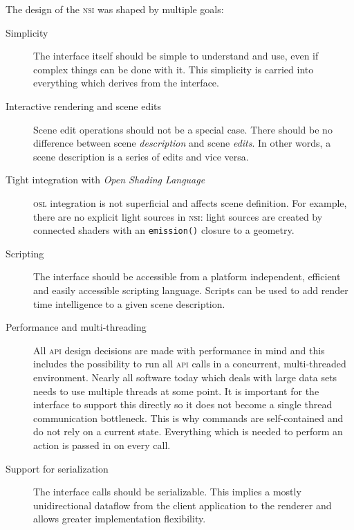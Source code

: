 \documentclass[oneside,ebook]{memoir}
\newcommand*{\acronym}[1]{\textsc{\lowercase{#1}}}
\begin{document}
The design of the \acronym{NSI} was shaped by multiple goals:\label{designgoal}
\begin{description}
\item[Simplicity]
The interface itself should be simple to understand and use, even if complex things can be done with it. This simplicity is carried into everything which derives from the interface.

\item[Interactive rendering and scene edits]
Scene edit operations should not be a special case. There should be no difference between scene \emph{description} and scene \emph{edits}. In other words, a scene description is a series of edits and vice versa.
\item[Tight integration with \textit{Open Shading Language}]
\index{osl integration@\acronym{OSL} integration}
\acronym{OSL} integration is not superficial and affects scene definition. For example, there are no explicit light sources in \acronym{NSI}: light sources are created by connected shaders with an \lstinline|emission()| closure to a geometry.
\item[Scripting]
The interface should be accessible from a platform independent, efficient and easily accessible scripting language. Scripts can be used to add render time intelligence to a given scene description.
\item[Performance and multi-threading]
All \acronym{API} design decisions are made with performance in mind and this includes the possibility to run all  \acronym{API} calls in a concurrent, multi-threaded environment.  Nearly all software today which deals with large data sets needs to use multiple threads at some point. It is important for the interface to support this directly so it does not become a single thread communication bottleneck. This is why commands are self-contained and do not rely on a current state. Everything which is needed to perform an action is passed in on every call.

\item[Support for serialization]
The interface calls should be serializable. This implies a mostly unidirectional dataflow from the client application to the renderer and allows greater implementation flexibility.


\end{description}
\end{document}
